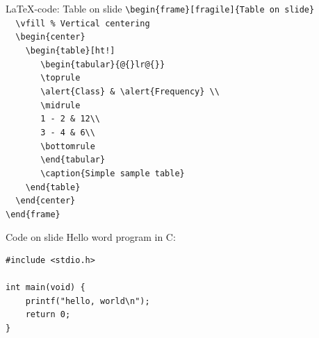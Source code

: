 \documentclass[t,11pt]{beamer}
\begin{document}
\toggleslidecolors
\begin{frame}[fragile]{\LaTeX-code: Table on slide}
\footnotesize
\verb|\begin{frame}[fragile]{Table on slide}|\\
\verb|  \vfill % Vertical centering|\\
\verb|  \begin{center}|\\
\verb|    \begin{table}[ht!]|\\
\verb|       \begin{tabular}{@{}lr@{}}|\\
\verb|       \toprule|\\
\verb|       \alert{Class} & \alert{Frequency} \\ |\\
\verb|       \midrule|\\
\verb|       1 - 2 & 12\\|\\
\verb|       3 - 4 & 6\\|\\
\verb|       \bottomrule|\\
\verb|       \end{tabular}|\\
\verb|       \caption{Simple sample table}|\\
\verb|    \end{table}|\\
\verb|  \end{center}|\\
\verb|\end{frame}|\\
\end{frame}
\toggleslidecolors


\begin{frame}[fragile]{Code on slide}
\alert{Hello word program in C:}
\begin{lstlisting}
#include <stdio.h>
 
int main(void) {
    printf("hello, world\n");
    return 0;
}
\end{lstlisting}
\end{frame}
\end{document}
